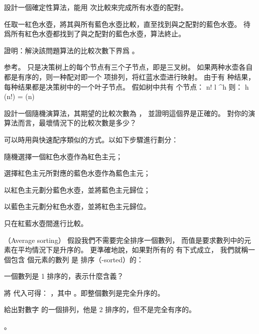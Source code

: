 \startigBase[a]
\startitem
設計一個確定性算法，能用  次比較來完成所有水壺的配對。
\stopitem

\startANSWER
任取一紅色水壺，將其與所有藍色水壺比較，直至找到與之配對的藍色水壺。
待爲所有紅色水壺都找到了與之配對的藍色水壺，算法終止。
\stopANSWER

\startitem
證明：解決該問題算法的比較次數下界爲 。
\stopitem

\startANSWER
参考。
只是决策树上的每个节点有三个子节点，即是{\EMP 三叉树}。
如果两种水壶各自都是有序的，则一种配对即一个  项排列，将红蓝水壶进行映射。
由于有  种结果，每种结果都是决策树中的一个叶子节点。
假如树中共有  个节点：
\startformula
n! \le l ^h
\stopformula
则：
\startformula
h \ge \lg(n!) = \Omega(n)
\stopformula
\stopANSWER

\startitem
設計一個隨機演算法，其期望的比較次數為 ，
並證明這個界是正確的。
對你的演算法而言，最壞情況下的比較次數是多少？
\stopitem

\startANSWER
可以時用與快速配序類似的方式。以如下步驟進行劃分：
\startigBase[n]
\item 隨機選擇一個紅色水壺作為紅色主元；
\item 選擇紅色主元所對應的藍色水壺作為藍色主元；
\item 以紅色主元劃分藍色水壺，並將藍色主元歸位；
\item 以藍色主元劃分紅色水壺，並將紅色主元歸位。
\stopigBase

只在紅藍水壺間進行比較。
\stopANSWER
\stopigBase
\stopPROBLEM

\startPROBLEM
（Average sorting）
假設我們不需要完全排序一個數列，
而值是要求數列中的元素在平均情況下是升序的。
更準確地說，如果對所有的  有下式成立，
我們就稱一個包含  個元素的數列  是 {\EMP {} 排序}（-sorted）的：
\startformula
{} \le {}
\stopformula

\startigBase[a]
\startitem
一個數列是 1 排序的，表示什麼含義？
\stopitem

\startANSWER
將  代入可得： ，其中 。即整個數列是完全升序的。
\stopANSWER

\startitem
給出對數字  的一個排列，他是 2 排序的，但不是完全有序的。
\stopitem

\startANSWER
{}。
\stopANSWER

